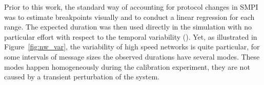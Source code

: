 
            Prior to this work, the standard way of accounting for protocol changes in SMPI was to estimate breakpoints
            visually and to conduct a linear regression for each range. The expected duration was then used directly in
            the simulation with no particular effort with respect to the temporal variability ().
            Yet, as illustrated in Figure~\ref{fig:nw_var}, the variability of high speed networks is quite particular,
            for some intervals of message sizes the observed durations have several modes. These modes happen
            homogeneously during the calibration experiment, they are not caused by a transient perturbation of the
            system.

